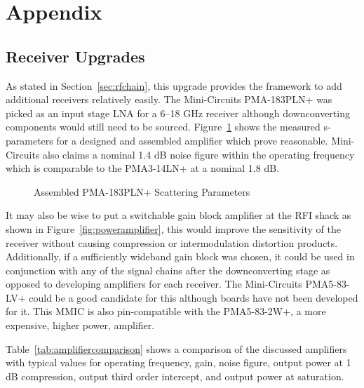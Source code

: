 \documentclass[titlepage]{article}
\begin{document}
\section{Appendix}
\subsection{Receiver Upgrades}
As stated in Section~\ref{sec:rfchain}, this upgrade provides the framework to add additional receivers relatively easily. The Mini-Circuits PMA-183PLN+ was picked as an input stage LNA for a 6--18 GHz receiver although downconverting components would still need to be sourced. Figure~\ref{fig:pma183} shows the measured s-parameters for a designed and assembled amplifier which prove reasonable. Mini-Circuits also claims a nominal 1.4 dB noise figure within the operating frequency which is comparable to the PMA3-14LN+ at a nominal 1.8 dB.

\begin{figure}[!htb]
  \begin{center}
    
  \end{center}
  \caption{Assembled PMA-183PLN+ Scattering Parameters}\label{fig:pma183}
\end{figure}

It may also be wise to put a switchable gain block amplifier at the RFI shack as shown in Figure~\ref{fig:poweramplifier}, this would improve the sensitivity of the receiver without causing compression or intermodulation distortion products. Additionally, if a sufficiently wideband gain block was chosen, it could be used in conjunction with any of the signal chains after the downconverting stage as opposed to developing amplifiers for each receiver. The Mini-Circuits PMA5-83-LV+ could be a good candidate for this although boards have not been developed for it. This MMIC is also pin-compatible with the PMA5-83-2W+, a more expensive, higher power, amplifier.

Table~\ref{tab:amplifiercomparison} shows a comparison of the discussed amplifiers with typical values for operating frequency, gain, noise figure, output power at 1 dB compression, output third order intercept, and output power at saturation.
\end{document}
